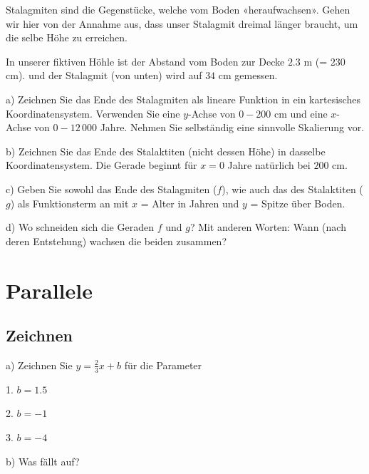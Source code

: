 Stalagmiten sind die Gegenstücke, welche vom Boden
«heraufwachsen». Gehen wir hier von der Annahme aus, dass unser
Stalagmit dreimal länger braucht, um die selbe Höhe zu erreichen.

In unserer fiktiven Höhle ist der Abstand vom Boden zur Decke $2.3$ m
(= $230$ cm). und der Stalagmit (von unten) wird auf $34$ cm gemessen.

a) Zeichnen Sie das Ende des Stalagmiten als
lineare Funktion in ein kartesisches Koordinatensystem. Verwenden Sie
eine $y$-Achse von $0 - 200$ cm und eine $x$-Achse von $0-12\,000$
Jahre. Nehmen Sie selbständig eine sinnvolle Skalierung vor.


b) Zeichnen Sie das Ende des Stalaktiten (nicht dessen Höhe) in
dasselbe Koordinatensystem. Die Gerade beginnt für $x=0$ Jahre
natürlich bei $200$ cm.
\newpage

c) Geben Sie sowohl das Ende des Stalagmiten ($f$), wie auch das des
Stalaktiten ($g$) als Funktionsterm an mit $x$ = Alter in Jahren und
$y$ = Spitze über Boden.



d) Wo schneiden sich die Geraden $f$ und $g$? Mit anderen Worten: Wann
(nach deren Entstehung) wachsen die beiden zusammen?


\section{Parallele}
\subsection{Zeichnen}
a) Zeichnen Sie $y=\frac23x+b$ für die Parameter

1. $b=1.5$

2. $b=-1$

3. $b= -4$


b) Was fällt auf?
\newpage
